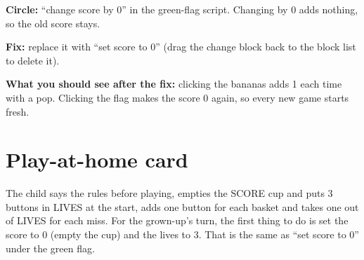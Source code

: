 \begin{answer}
\textbf{Circle:} \enquote{change score by 0} in the green-flag script. Changing by 0 adds nothing, so the old score stays.

\textbf{Fix:} replace it with \enquote{set score to 0} (drag the change block back to the block list to delete it).

\textbf{What you should see after the fix:} clicking the bananas adds 1 each time with a pop. Clicking the flag makes the score 0 again, so every new game starts fresh.
\end{answer}

\section{Play-at-home card}
\begin{answer}
The child says the rules before playing, empties the SCORE cup and puts 3 buttons in LIVES at the start, adds one button for each basket and takes one out of LIVES for each miss. For the grown-up's turn, the first thing to do is set the score to 0 (empty the cup) and the lives to 3. That is the same as \enquote{set score to 0} under the green flag.
\end{answer}
